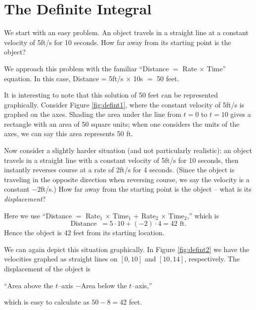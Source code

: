 \section{The Definite Integral}\label{sec:def_int}

We start with an easy problem. An object travels in a straight line at a constant velocity of 5ft/s for 10 seconds. How far away from its starting point is the object?

We approach this problem with the familiar ``Distance $=$ Rate $\times$ Time'' equation. In this case, Distance = 5ft/s $\times$ 10s $=$ 50 feet.

It is interesting to note that this solution of 50 feet can be represented graphically. Consider Figure \ref{fig:defint1}, where the constant velocity of 5ft/s is graphed on the axes. Shading the area under the line from $t=0$ to $t=10$ gives a rectangle with an area of 50 square units; when one considers the units of the axes, we can say this area represents 50 ft.


Now consider a slightly harder situation (and not particularly realistic): an object travels in a straight line with a constant velocity of 5ft/s for 10 seconds, then instantly reverses course at a rate of 2ft/s for 4 seconds. (Since the object is traveling in the opposite direction when reversing course, we say the velocity is a constant $-2$ft/s.) How far away from the starting point is the object -- what is its \textit{displacement}?

Here we use ``Distance $=$ Rate$_1$ $\times$ Time$_1$ + Rate$_2$ $\times$ Time$_2$,'' which is 
	$$\text{Distance } \ = 5\cdot10 + (-2)\cdot 4 = 42\text{ ft.}$$ 
Hence the object is 42 feet from its starting location.

We can again depict this situation graphically. In Figure \ref{fig:defint2} we have the velocities graphed as straight lines on $[0,10]$ and $[10,14]$, respectively. The displacement of the object is 
		\begin{center}``Area above the $t$--axis \quad $-$\quad Area below the $t$--axis,''
		\end{center}
which is easy to calculate as $50-8=42$ feet.


